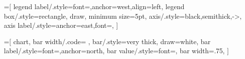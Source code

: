   \newcommand{\appendixref}[1]{\hyperref[#1]{Appendix \ref*{#1}}}
  \newcommand{\chapterref}[1]{\hyperref[#1]{Chapter \ref*{#1}}}
  \newcommand{\sectionref}[1]{\hyperref[#1]{Section \ref*{#1}}}
  \newcommand{\figureref}[1]{\hyperref[#1]{Figure \ref*{#1}}}
  \newcommand{\tableref}[1]{\hyperref[#1]{Table \ref*{#1}}}
  \newcommand{\listingref}[1]{\hyperref[#1]{Listing \ref*{#1}}}
  \newcommand{\onpage}[1]{on \hyperref[#1]{page \pageref*{#1}}}
  \newcommand{\equationref}[1]{\hyperref[#1]{Equation \ref*{#1}}}
  \newcommand{\algorithmref}[1]{\hyperref[#1]{Algorithm \ref*{#1}}}


\let\oldTodo\todo
\renewcommand{\todo}[1]{\tikzexternaldisable{}\oldTodo{#1}\tikzexternalenable{}}



\makeatletter
\newcommand{\gpm}{\mathbin{\mathpalette\@gpm\relax}}
\newcommand{\@gpm}[2]{\ooalign{%
  \raisebox{.1\height}{$#1+$}\cr
  \smash{\raisebox{-.6\height}{$#1-$}}\cr}}
\makeatother



\makeatletter

=[
    legend label/.style={font={\scriptsize},anchor=west,align=left},
    legend box/.style={rectangle, draw, minimum size=5pt},
    axis/.style={black,semithick,->},
    axis label/.style={anchor=east,font={\tiny}},
]

=[
    chart,
    bar width/.code={
        \global\let\bar@w\pgfmathresult
    },
    bar/.style={very thick, draw=white},
    bar label/.style={font={\bf\small},anchor=north},
    bar value/.style={font={\footnotesize}},
    bar width=.75,
]

